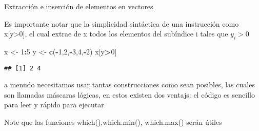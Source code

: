 \documentclass[ignorenonframetext,]{beamer}
\newenvironment{Shaded}{\begin{snugshade}}{\end{snugshade}}
\newcommand{\KeywordTok}[1]{\textcolor[rgb]{0.13,0.29,0.53}{\textbf{#1}}}
\newcommand{\DecValTok}[1]{\textcolor[rgb]{0.00,0.00,0.81}{#1}}
\newcommand{\StringTok}[1]{\textcolor[rgb]{0.31,0.60,0.02}{#1}}
\newcommand{\OperatorTok}[1]{\textcolor[rgb]{0.81,0.36,0.00}{\textbf{#1}}}
\newcommand{\NormalTok}[1]{#1}
\begin{document}
\begin{frame}[fragile]{Extracción e inserción de elementos en vectores}

Es importante notar que la simplicidad sintáctica de una instrucción
como x{[}y\textgreater{}0{]}, el cual extrae de x todos los elementos
del subíndice i tales que \(y_i>0\)

\begin{Shaded}
\begin{Highlighting}[]
\NormalTok{x <-}\StringTok{ }\DecValTok{1}\OperatorTok{:}\DecValTok{5}
\NormalTok{y <-}\StringTok{ }\KeywordTok{c}\NormalTok{(}\OperatorTok{-}\DecValTok{1}\NormalTok{,}\DecValTok{2}\NormalTok{,}\OperatorTok{-}\DecValTok{3}\NormalTok{,}\DecValTok{4}\NormalTok{,}\OperatorTok{-}\DecValTok{2}\NormalTok{)}
\NormalTok{x[y}\OperatorTok{>}\DecValTok{0}\NormalTok{]}
\end{Highlighting}
\end{Shaded}
\pause
\begin{verbatim}
## [1] 2 4
\end{verbatim}

a menudo necesitamos usar tantas construcciones como sean posibles, las
cuales son llamadas máscaras lógicas, en estos existen dos ventajs: el
código es sencillo para leer y rápido para ejecutar

Note que las funciones which(),which.min(), which.max() serán útiles

\end{frame}
\end{document}
